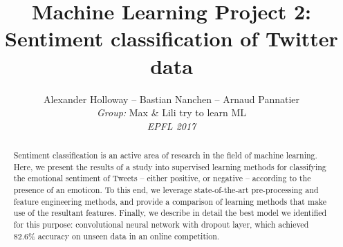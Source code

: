 \documentclass[10pt,conference,compsocconf]{IEEEtran}
\begin{document}
\title{Machine Learning Project 2:\\Sentiment classification of Twitter data}
\author{
 Alexander Holloway -- Bastian Nanchen -- Arnaud Pannatier 
  \\
  \textit{Group:} Max \& Lili try to learn ML\\
  \textit{EPFL 2017}
}
\maketitle

\begin{abstract}
Sentiment classification is an active area of research in the field of machine learning. Here, we present the results of a study into supervised learning methods for classifying the emotional sentiment of Tweets -- either positive, or negative -- according to the presence of an emoticon. To this end, we leverage state-of-the-art pre-processing and feature engineering methods, and provide a comparison of learning methods that make use of the resultant features. Finally, we describe in detail the best model we identified for this purpose: convolutional neural network with dropout layer, which achieved 82.6\% accuracy on unseen data in an online competition.
\end{abstract}









\end{document}
